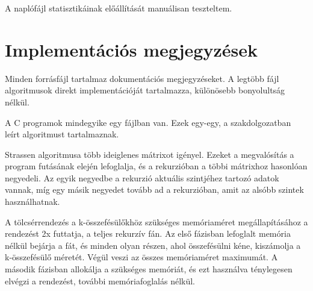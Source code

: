 \documentclass[12pt]{report}
\begin{document}
A naplófájl statisztikáinak előállítását manuálisan teszteltem.

\section{Implementációs megjegyzések}

Minden forrásfájl tartalmaz dokumentációs megjegyzéseket.
A legtöbb fájl algoritmusok direkt implementációját tartalmazza,
különösebb bonyolultság nélkül.

\bigskip

A C programok mindegyike egy fájlban van.
Ezek egy-egy, a szakdolgozatban leírt algoritmust tartalmaznak.

Strassen algoritmusa több ideiglenes mátrixot igényel.
Ezeket a megvalósítás a program futásának elején lefoglalja,
és a rekurzióban a többi mátrixhoz hasonlóan negyedeli.
Az egyik negyedbe a rekurzió aktuális szintjéhez tartozó adatok vannak,
míg egy másik negyedet tovább ad a rekurzióban,
amit az alsóbb szintek használhatnak.

A tölcsérrendezés a k-összefésülőkhöz szükséges memóriaméret megállapításához
a rendezést 2x futtatja, a teljes rekurzív fán.
Az első fázisban lefoglalt memória nélkül bejárja a fát,
és minden olyan részen, ahol összefésülni kéne,
kiszámolja a k-összefésülő méretét.
Végül veszi az összes memóriaméret maximumát.
A második fázisban allokálja a szükséges memóriát,
és ezt használva ténylegesen elvégzi a rendezést, további
memóriafoglalás nélkül.

\bigskip
\end{document}
